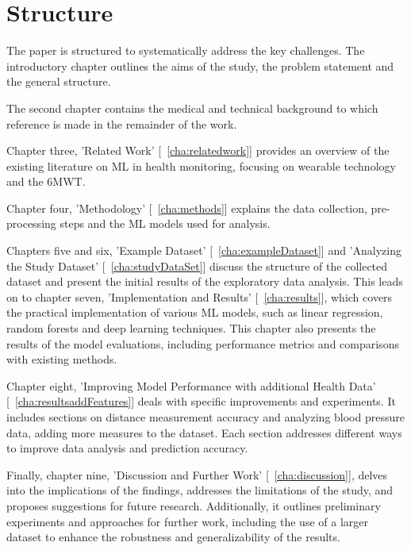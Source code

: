 \section{Structure}

The paper is structured to systematically address the key challenges. The introductory chapter outlines the aims of the study, the problem statement and the general structure.

The second chapter contains the medical and technical background to which reference is made in the remainder of the work.

Chapter three, 'Related Work' [~\ref{cha:relatedwork}] provides an overview of the existing literature on ML in health monitoring, focusing on wearable technology and the 6MWT.

Chapter four, 'Methodology' [~\ref{cha:methods}] explains the data collection, pre-processing steps and the ML models used for analysis.

Chapters five and six, 'Example Dataset' [~\ref{cha:exampleDataset}] and 'Analyzing the Study Dataset' [~\ref{cha:studyDataSet}] discuss the structure of the collected dataset and present the initial results of the exploratory data analysis. This leads on to chapter seven, 'Implementation and Results' [~\ref{cha:results}], which covers the practical implementation of various ML models, such as linear regression, random forests and deep learning techniques. This chapter also presents the results of the model evaluations, including performance metrics and comparisons with existing methods.

Chapter eight, 'Improving Model Performance with additional Health Data' [~\ref{cha:resultsaddFeatures}] deals with specific improvements and experiments. It includes sections on distance measurement accuracy and analyzing blood pressure data, adding more measures to the dataset. Each section addresses different ways to improve data analysis and prediction accuracy.

Finally, chapter nine, 'Discussion and Further Work' [~\ref{cha:discussion}], delves into the implications of the findings, addresses the limitations of the study, and proposes suggestions for future research. Additionally, it outlines preliminary experiments and approaches for further work, including the use of a larger dataset to enhance the robustness and generalizability of the results.